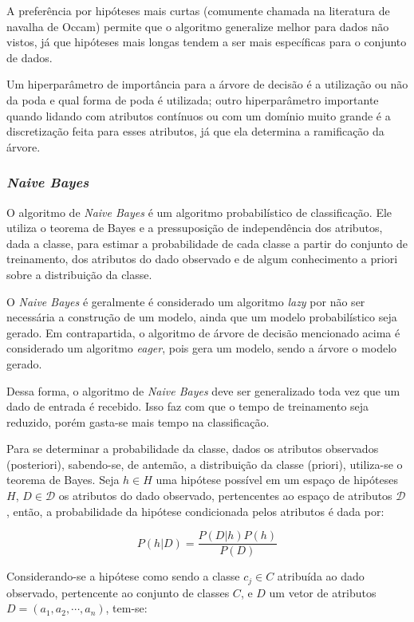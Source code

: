 \documentclass{article}
\begin{document}
A preferência por hipóteses mais curtas (comumente chamada na literatura de navalha de Occam) permite que o algoritmo generalize melhor para dados não vistos, já que hipóteses mais longas tendem a ser mais específicas para o conjunto de dados.

Um hiperparâmetro de importância para a árvore de decisão é a utilização ou não da poda e qual forma de poda é utilizada; outro hiperparâmetro importante quando lidando com atributos contínuos ou com um domínio muito grande é a discretização feita para esses atributos, já que ela determina a ramificação da árvore.

\subsubsection{{\b \it Naive Bayes}}

O algoritmo de {\it Naive Bayes} é um algoritmo probabilístico de classificação. Ele utiliza o teorema de Bayes e a pressuposição de independência dos atributos, dada a classe, para estimar a probabilidade de cada classe a partir do conjunto de treinamento, dos atributos do dado observado e de algum conhecimento a priori sobre a distribuição da classe.

O {\it Naive Bayes} é geralmente é considerado um algoritmo {\it lazy} por não ser necessária a construção de um modelo, ainda que um modelo probabilístico seja gerado. Em contrapartida, o algoritmo de árvore de decisão mencionado acima é considerado um algoritmo {\it eager}, pois gera um modelo, sendo a árvore o modelo gerado.

Dessa forma, o algoritmo de {\it Naive Bayes} deve ser generalizado toda vez que um dado de entrada é recebido. Isso faz com que o tempo de treinamento seja reduzido, porém gasta-se mais tempo na classificação.

Para se determinar a probabilidade da classe, dados os atributos observados (posteriori), sabendo-se, de antemão, a distribuição da classe (priori), utiliza-se o teorema de Bayes. Seja $h \in H$ uma hipótese possível em um espaço de hipóteses $H$, $D \in \mathcal{D}$ os atributos do dado observado, pertencentes ao espaço de atributos $\mathcal{D}$, então, a probabilidade da hipótese condicionada pelos atributos é dada por:

\begin{equation}
P(h|D) = \frac{P(D|h) P(h)}{P(D)}
\end{equation}

Considerando-se a hipótese como sendo a classe $c_j \in C$ atribuída ao dado observado, pertencente ao conjunto de classes $C$, e $D$ um vetor de atributos $D = (a_1,a_2,\cdots,a_n)$, tem-se:
\end{document}
